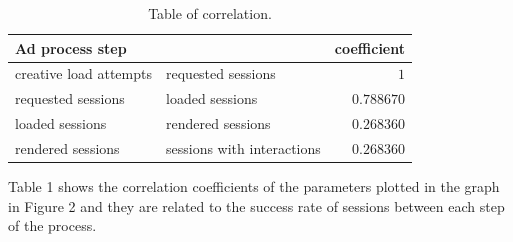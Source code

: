 \documentclass[fleqn,moreauthors,10pt]{ds_report}
\begin{document}
\begin{table}[hbt]
	\caption{Table of correlation.}
	\centering
	\begin{tabular}{l l | r}
		\cmidrule(r){1-2}
		Ad process step &  & coefficient \\
		\midrule
		creative load attempts & requested sessions & $1$ \\
		requested sessions  & loaded sessions & $0.788670$ \\
		loaded sessions & rendered sessions & $0.268360$ \\
		rendered sessions & sessions with interactions & $0.268360$ \\
		\bottomrule
	\end{tabular}
	\label{tab:label}
\end{table}
Table 1 shows the correlation coefficients of the parameters plotted in the graph in Figure 2 and they are related to the success rate of sessions between each step of the process.
\end{document}
